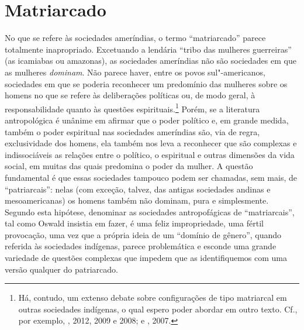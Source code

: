 \section{Matriarcado}

No que se refere às sociedades ameríndias, o termo ``matriarcado''
parece totalmente inapropriado. Excetuando a lendária ``tribo das
mulheres guerreiras'' (as icamiabas ou amazonas), as sociedades
ameríndias não são sociedades em que as mulheres \emph{dominam}. Não
parece haver, entre os povos sul"-americanos, sociedades em que se
poderia reconhecer um predomínio das mulheres sobre os homens no que se
refere às deliberações políticas ou, de modo geral, à responsabilidade
quanto às questões espirituais.\footnote{Há, contudo, um extenso debate
  sobre configurações de tipo matriarcal em outras sociedades indígenas,
  o qual espero poder abordar em outro texto. Cf., por exemplo,
  , 2012, 2009 e 2008; e , 2007.} Porém, se a
literatura antropológica é unânime em afirmar que o poder político e, em
grande medida, também o poder espiritual nas sociedades ameríndias são,
via de regra, exclusividade dos homens, ela também nos leva a reconhecer
que são complexas e indissociáveis as relações entre o político, o
espiritual e outras dimensões da vida social, em muitas das quais
predomina o poder da mulher. A questão fundamental é que essas
sociedades tampouco podem ser chamadas, sem mais, de ``patriarcais'':
nelas (com exceção, talvez, das antigas sociedades andinas e
mesoamericanas) os homens também não dominam, pura e simplesmente.
Segundo esta hipótese, denominar as sociedades antropofágicas de
``matriarcais'', tal como Oswald insistia em fazer, é uma feliz
impropriedade, uma fértil provocação, uma vez que a própria ideia de um
``domínio de gênero'', quando referida às sociedades indígenas, parece
problemática e esconde uma grande variedade de questões complexas que
impedem que as identifiquemos com uma versão qualquer do patriarcado.

